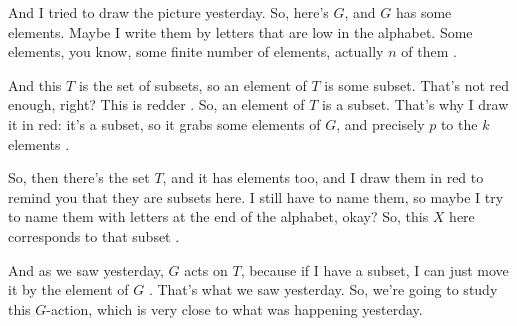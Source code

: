 \begin{proofWrapper}
\begin{speech}[00:04:16 - 00:05:46]
And I tried to draw the picture yesterday. So, here's $G$, and $G$ has some elements. Maybe I write them by letters that are low in the alphabet. Some elements, you know, some finite number of elements, actually $n$ of them .

And this $T$ is the set of subsets, so an element of $T$ is some subset. That's not red enough, right? This is redder . So, an element of $T$ is a subset. That's why I draw it in red: it's a subset, so it grabs some elements of $G$, and precisely $p$ to the $k$ elements .

So, then there's the set $T$, and it has elements too, and I draw them in red to remind you that they are subsets here. I still have to name them, so maybe I try to name them with letters at the end of the alphabet, okay? So, this $X$ here corresponds to that subset .

And as we saw yesterday, $G$ acts on $T$, because if I have a subset, I can just move it by the element of $G$ . That's what we saw yesterday. So, we're going to study this $G$-action, which is very close to what was happening yesterday.
\end{speech}


\end{proofWrapper}
